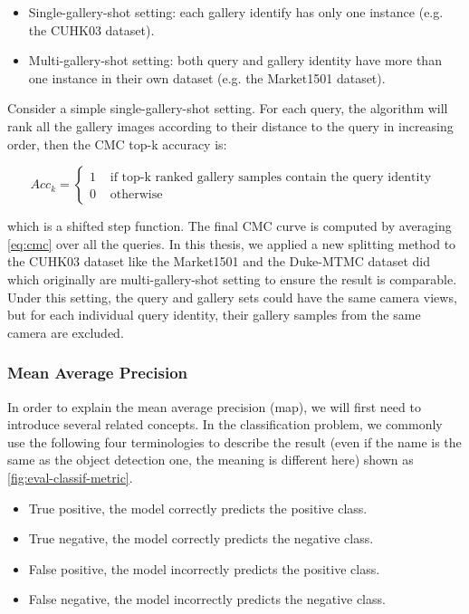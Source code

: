 \begin{itemize}
    \item Single-gallery-shot setting: 
    each gallery identify has only one instance (e.g. the CUHK03 dataset).

    \item Multi-gallery-shot setting: 
    both query and gallery identity have more than one instance in their own
    dataset (e.g. the Market1501 dataset).
\end{itemize}

Consider a simple single-gallery-shot setting. For each query, the algorithm
will rank all the gallery images according to their distance to the query in
increasing order, then the CMC top-k accuracy is:

\begin{equation}
\label{eq:cmc}
\mathit{Acc}_{k}=
\left
\{\begin{array}{ll}
{1} & {\text { if top-k ranked gallery samples contain the query identity }} \\
{0} & {\text { otherwise }}
\end{array}
\right.
\end{equation}

\noindent which is a shifted step function. The final CMC curve is computed by
averaging \autoref{eq:cmc} over all the queries.
In this thesis, we applied a new splitting method \cite{dataset-cuhk03-np-2017}
to the CUHK03 dataset like the Market1501 and the Duke-MTMC dataset did which
originally are multi-gallery-shot setting to ensure the result is comparable.
Under this setting, the query and gallery sets could have the same camera views, but
for each individual query identity, their gallery samples from the same
camera are excluded.

\subsubsection{Mean Average Precision}
\label{sec:Eval-reid-map}

In order to explain the mean average precision (\acrshort{map}), 
we will first need to
introduce several related concepts. In the classification problem, we commonly
use the following four terminologies to describe the result (even if the name is the
same as the object detection one, the meaning is different here) shown as
\autoref{fig:eval-classif-metric}.

\begin{itemize}
    \item True positive, the model correctly predicts the positive class.
    \item True negative, the model correctly predicts the negative class.
    \item False positive, the model incorrectly predicts the positive class.
    \item False negative, the model incorrectly predicts the negative class.
\end{itemize}

